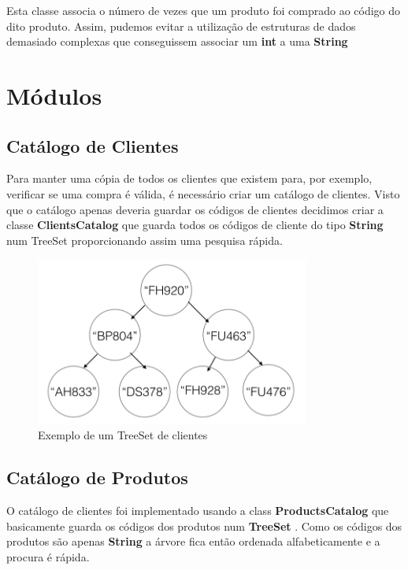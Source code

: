 \documentclass[10pt] {article}
\begin{document}
Esta classe associa o número de vezes que um produto foi comprado ao código do dito produto.
Assim, pudemos evitar a utilização de estruturas de dados demasiado complexas que conseguissem associar um \textbf{int} a uma \color{blue} \textbf{String} \color{black}

\newpage
\section{Módulos}
\subsection{Catálogo de Clientes}

Para manter uma cópia de todos os clientes que existem para, por exemplo, verificar se uma compra é válida, é necessário
criar um catálogo de clientes.
Visto que o catálogo apenas deveria guardar os códigos de clientes decidimos criar a classe \color{blue} \textbf{ClientsCatalog} 
\color{black} que guarda todos os códigos de cliente do tipo \color{blue} \textbf{String} \color{black} num TreeSet 
proporcionando assim uma pesquisa rápida.

\begin{figure}[ht!]
\centering
\includegraphics[width=90mm]{catclientes.png}
\caption{Exemplo de um TreeSet de clientes}
\end{figure}

\newpage
\subsection{Catálogo de Produtos}

O catálogo de clientes foi implementado usando a class \color{blue} \textbf{ProductsCatalog} \color{black} que basicamente 
guarda os códigos dos produtos num \color{blue} \textbf{TreeSet} \color{black}.
Como os códigos dos produtos são apenas \color{blue} \textbf{String} \color{black} a árvore fica então ordenada alfabeticamente e a procura é rápida.
\end{document}
